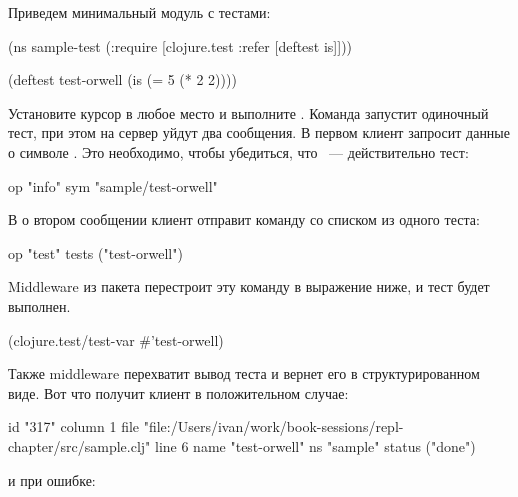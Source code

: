 Приведем минимальный модуль с тестами:

\begin{english}
  \begin{clojure}
(ns sample-test
  (:require
   [clojure.test :refer [deftest is]]))

(deftest test-orwell
  (is (= 5 (* 2 2))))
  \end{clojure}
\end{english}

Установите курсор в любое место  и выполните . Команда запустит одиночный тест, при этом на сервер уйдут два сообщения. В первом клиент запросит данные о символе . Это необходимо, чтобы убедиться, что ~--- действительно тест:

\begin{english}
  \begin{text}
  op   "info"
  sym  "sample/test-orwell"
  \end{text}
\end{english}
В
о втором сообщении клиент отправит команду  со списком из одного теста:

\begin{english}
  \begin{text}
  op     "test"
  tests  ("test-orwell")
  \end{text}
\end{english}

Middleware из пакета  перестроит эту команду в выражение ниже, и тест будет выполнен.

\begin{english}
  \begin{clojure}
(clojure.test/test-var #'test-orwell)
  \end{clojure}
\end{english}

Также middleware перехватит вывод теста и вернет его в структурированном виде. Вот что получит клиент в положительном случае:

\begin{english}
  \begin{text}
  id      "317"
  column  1
  file    "file:/Users/ivan/work/book-sessions/repl-chapter/src/sample.clj"
  line    6
  name    "test-orwell"
  ns      "sample"
  status  ("done")
  \end{text}
\end{english}

и при ошибке:

